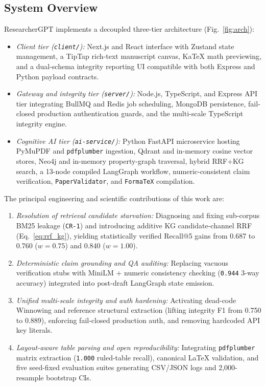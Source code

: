 \documentclass[conference]{IEEEtran}
\begin{document}
\subsection{System Overview}
ResearcherGPT implements a decoupled three-tier architecture (Fig.~\ref{fig:arch}):
\begin{itemize}
  \item \emph{Client tier (\texttt{client/}):} Next.js and React interface with Zustand state management, a TipTap rich-text manuscript canvas, KaTeX math previewing, and a dual-schema integrity reporting UI compatible with both Express and Python payload contracts.
  \item \emph{Gateway and integrity tier (\texttt{server/}):} Node.js, TypeScript, and Express API tier integrating BullMQ and Redis job scheduling, MongoDB persistence, fail-closed production authentication guards, and the multi-scale TypeScript integrity engine.
  \item \emph{Cognitive AI tier (\texttt{ai-service/}):} Python FastAPI microservice hosting PyMuPDF and \texttt{pdfplumber} ingestion, Qdrant and in-memory cosine vector stores, Neo4j and in-memory property-graph traversal, hybrid RRF+KG search, a 13-node compiled LangGraph workflow, numeric-consistent claim verification, \texttt{PaperValidator}, and \texttt{FormaTeX} compilation.
\end{itemize}

The principal engineering and scientific contributions of this work are:
\begin{enumerate}
  \item \emph{Resolution of retrieval candidate starvation:} Diagnosing and fixing sub-corpus BM25 leakage (\texttt{CR-1}) and introducing additive KG candidate-channel RRF (Eq.~\eqref{eq:rrf_kg}), yielding statistically verified Recall@5 gains from 0.687 to 0.760 ($w{=}0.75$) and 0.840 ($w{=}1.00$).
  \item \emph{Deterministic claim grounding and QA auditing:} Replacing vacuous verification stubs with MiniLM + numeric consistency checking (\texttt{0.944} 3-way accuracy) integrated into post-draft LangGraph state emission.
  \item \emph{Unified multi-scale integrity and auth hardening:} Activating dead-code Winnowing and reference structural extraction (lifting integrity F1 from 0.750 to 0.889), enforcing fail-closed production auth, and removing hardcoded API key literals.
  \item \emph{Layout-aware table parsing and open reproducibility:} Integrating \texttt{pdfplumber} matrix extraction (\texttt{1.000} ruled-table recall), canonical LaTeX validation, and five seed-fixed evaluation suites generating CSV/JSON logs and 2,000-resample bootstrap CIs.
\end{enumerate}
\end{document}
